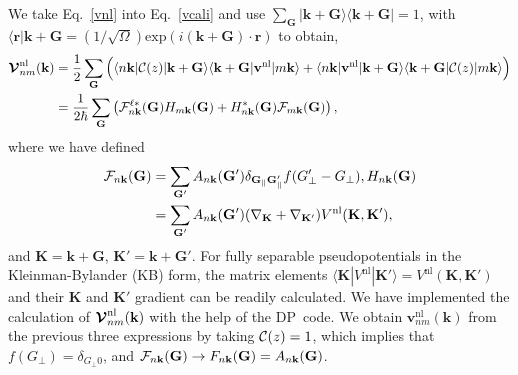 \documentclass[floatfix,prb,aps,superscriptaddress,showpacs,letterpaper]{revtex4}
\begin{document}
We take Eq.~\eqref{vnl} into Eq.~\eqref{vcali}
and use
$\sum_{\mathbf{G}} | \mathbf{k}+\mathbf{G}\rangle \langle\mathbf{k}+\mathbf{G} | =1$, 
with
$\langle\mathbf{r}|\mathbf{k}+\mathbf{G}=(1/\sqrt{\Omega})
\mathrm{exp}(i(\mathbf{k}+\mathbf{G})\cdot\mathbf{r})$
to obtain,
\begin{align*}
\boldsymbol{\mathcal{\cal V}}^{\mathrm{nl}}_{nm}(\mathbf{k})&=\frac{1}{2}
\sum_{\mathbf{G}}
\Big(
\langle n\mathbf{k} | {\mathbf{\cal C}}(z) 
| \mathbf{k}+\mathbf{G}\rangle\langle\mathbf{k}+\mathbf{G} |
\mathbf{v}^\mathrm{nl} | m\mathbf{k}\rangle
+
\langle n\mathbf{k} |
\mathbf{v}^\mathrm{nl}  
| \mathbf{k}+\mathbf{G}\rangle\langle\mathbf{k}+\mathbf{G} |
{\mathbf{\cal C}}(z) | m\mathbf{k}\rangle
\Big)
\nonumber\\
&=\frac{1}{2 \hbar}
\sum_{\mathbf{G}}
\left(
{\mathbf{\cal F}}^{\ell*}_{n\mathbf{k}}(\mathbf{G}) 
H_{m\mathbf{k}}(\mathbf{G}) 
+
H^*_{n\mathbf{k}}(\mathbf{G}) 
{\mathbf{\cal F}}_{m\mathbf{k}}(\mathbf{G}) 
\right) 
,
\end{align*}  
where 
we have defined  
\begin{align*}
{\mathbf{\cal F}}_{n\mathbf{k}}(\mathbf{G}) 
&=
\sum_{\mathbf{G}'} 
A_{n\mathbf{k}}(\mathbf{G}') 
\delta_{\mathbf{G}_\parallel \mathbf{G}'_\parallel}f(G'_\perp-G_\perp) 
,
H_{n\mathbf{k}}(\mathbf{G})\\
&=
\sum_{\mathbf{G}'} 
A_{n\mathbf{k}}(\mathbf{G}') 
(\nabla_{\mathbf{K}}+\nabla_{\mathbf{K}'})  
V^\mathrm{nl}(\mathbf{K},\mathbf{K}')
,
\end{align*}
and $\mathbf{K}=\mathbf{k}+\mathbf{G}$, $\mathbf{K}'=\mathbf{k}+\mathbf{G}'$.
For fully  separable pseudopotentials in the   
Kleinman-Bylander (KB) form,\cite{mottaCMS10,kleinmanPRL82,adolphPRB96}  
the  
matrix elements 
 $\langle\mathbf{K} |
V^\mathrm{nl}  
| \mathbf{K}'\rangle
=V^\mathrm{nl}(\mathbf{K},\mathbf{K}')  
$ 
and their $\mathbf{K}$ and $\mathbf{K}'$ gradient 
can be readily calculated.\cite{mottaCMS10,adolphPRB96,gordienkoRPJ04,fuchsCPC99} 
We have 
implemented 
the calculation of $\boldsymbol{\mathcal{\cal V}}^{\mathrm{nl}}_{nm}(\mathbf{k})$ with the help of 
the DP\texttrademark~code.\cite{francesco}
We obtain $\mathbf{v}^{\mathrm{nl}}_{nm}(\mathbf{k})$ from the previous three 
expressions by taking ${\mathbf{\cal C}}(z)=1$, which implies 
that $f(G_\perp)=\delta_{G_\perp 0}$, 
and 
${\mathbf{\cal F}}_{n\mathbf{k}}(\mathbf{G}) \to F_{n\mathbf{k}}(\mathbf{G})=A_{n\mathbf{k}}(\mathbf{G})$.
\end{document}
